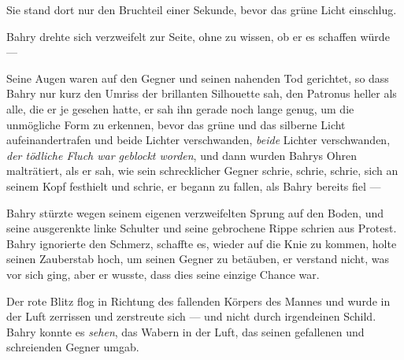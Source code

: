 Sie stand dort nur den Bruchteil einer Sekunde, bevor das grüne Licht einschlug.

\later

Bahry drehte sich verzweifelt zur Seite, ohne zu wissen, ob er es schaffen würde —

Seine Augen waren auf den Gegner und seinen nahenden Tod gerichtet, so dass Bahry nur kurz den Umriss der brillanten Silhouette sah, den Patronus heller als alle, die er je gesehen hatte, er sah ihn gerade noch lange genug, um die unmögliche Form zu erkennen, bevor das grüne und das silberne Licht aufeinandertrafen und beide Lichter verschwanden, \emph{beide} Lichter verschwanden, \emph{der tödliche Fluch war geblockt worden}, und dann wurden Bahrys Ohren malträtiert, als er sah, wie sein schrecklicher Gegner schrie, schrie, schrie, sich an seinem Kopf festhielt und schrie, er begann zu fallen, als Bahry bereits fiel —

Bahry stürzte wegen seinem eigenen verzweifelten Sprung auf den Boden, und seine ausgerenkte linke Schulter und seine gebrochene Rippe schrien aus Protest. Bahry ignorierte den Schmerz, schaffte es, wieder auf die Knie zu kommen, holte seinen Zauberstab hoch, um seinen Gegner zu betäuben, er verstand nicht, was vor sich ging, aber er wusste, dass dies seine einzige Chance war.


Der rote Blitz flog in Richtung des fallenden Körpers des Mannes und wurde in der Luft zerrissen und zerstreute sich — und nicht durch irgendeinen Schild. Bahry konnte es \emph{sehen}, das Wabern in der Luft, das seinen gefallenen und schreienden Gegner umgab.

